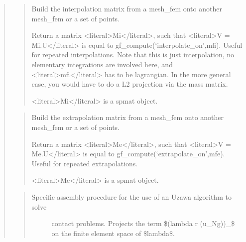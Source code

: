 \documentclass[a4paper,11pt,english]{sphinxmanual}
\begin{document}
\begin{quote}
\begin{quote}
\sphinxAtStartPar
Build the interpolation matrix from a mesh\_fem onto another mesh\_fem or a set of points.

\sphinxAtStartPar
Return a matrix \textless{}literal\textgreater{}Mi\textless{}/literal\textgreater{}, such that \textless{}literal\textgreater{}V = Mi.U\textless{}/literal\textgreater{} is equal to
gf\_compute(‘interpolate\_on’,mfi). Useful for repeated interpolations.
Note that this is just interpolation, no elementary integrations
are involved here, and \textless{}literal\textgreater{}mfi\textless{}/literal\textgreater{} has to be lagrangian. In the more
general case, you would have to do a L2 projection via the mass
matrix.

\sphinxAtStartPar
\textless{}literal\textgreater{}Mi\textless{}/literal\textgreater{} is a spmat object.
\end{quote}

\sphinxAtStartPar
{}
\begin{quote}

\sphinxAtStartPar
Build the extrapolation matrix from a mesh\_fem onto another mesh\_fem or a set of points.

\sphinxAtStartPar
Return a matrix \textless{}literal\textgreater{}Me\textless{}/literal\textgreater{}, such that \textless{}literal\textgreater{}V = Me.U\textless{}/literal\textgreater{} is equal to
gf\_compute(‘extrapolate\_on’,mfe). Useful for repeated
extrapolations.

\sphinxAtStartPar
\textless{}literal\textgreater{}Me\textless{}/literal\textgreater{} is a spmat object.
\end{quote}

\sphinxAtStartPar
{}
\begin{quote}
\begin{description}
\item[{Specific assembly procedure for the use of an Uzawa algorithm to solve}] \leavevmode
\sphinxAtStartPar
contact problems. Projects the term \$\sphinxhyphen{}(lambda \sphinxhyphen{} r (u\_N\sphinxhyphen{}g))\_\sphinxhyphen{}\$ on the
finite element space of \$lambda\$.


\end{description}
\end{quote}
\end{quote}
\end{document}
